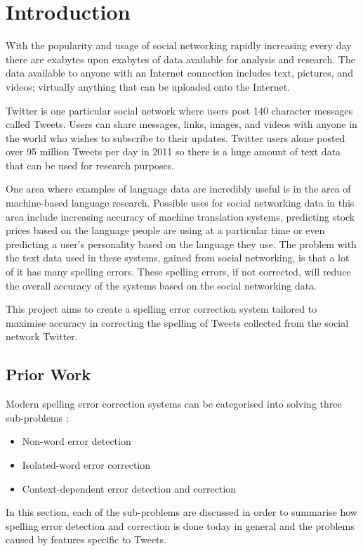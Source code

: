 \chapter{Introduction}
With the popularity and usage of social networking rapidly increasing every day there are exabytes upon exabytes of data available for analysis and research. The data available to anyone with an Internet connection includes text, pictures, and videos; virtually anything that can be uploaded onto the Internet.

Twitter is one particular social network where users post 140 character messages called Tweets. Users can share messages, links, images, and videos with anyone in the world who wishes to subscribe to their updates. Twitter users alone posted over 95 million Tweets per day in 2011 \cite{} so there is a huge amount of text data that can be used for research purposes.

One area where examples of language data are incredibly useful is in the area of machine-based language research. Possible uses for social networking data in this area include increasing accuracy of machine translation systems, predicting stock prices based on the language people are using at a particular time or even predicting a user's personality based on the language they use. The problem with the text data used in these systems, gained from social networking, is that a lot of it has many spelling errors. These spelling errors, if not corrected, will reduce the overall accuracy of the systems based on the social networking data.

This project aims to create a spelling error correction system tailored to maximise accuracy in correcting the spelling of Tweets collected from the social network Twitter.

\section{Prior Work}
Modern spelling error correction systems can be categorised into solving three sub-problems \cite{Kukich1992}:

\begin{itemize}
\item
Non-word error detection
\item
Isolated-word error correction
\item
Context-dependent error detection and correction
\end{itemize}

In this section, each of the sub-problems are discussed in order to summarise how spelling error detection and correction is done today in general and the problems caused by features specific to Tweets.

